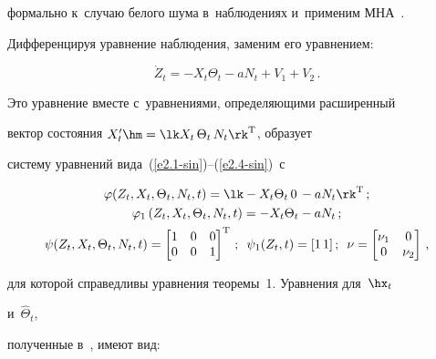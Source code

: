 формально к~случаю белого шума в~наблюдениях и~применим МНА~\cite{3-sin, 4-sin}. 


Дифференцируя уравнение наблюдения, заменим его уравнением:


\begin{equation*}


\dot Z_t= -X_t\Theta_t - aN_t +V_1+V_2\,.




\end{equation*}


Это уравнение вместе с~уравнениями, определяющими расширенный


вектор состояния $X_t' \hm=\lk X_t\,\Theta_t\,N_t\rk^{\mathrm{T}}$, образует


систему уравнений вида~(\ref{e2.1-sin})--(\ref{e2.4-sin})~с


\begin{gather*}


\varphi(Z_t,X_t,\Theta_t,


N_t,t) = \lk -X_t\Theta_t\,0\, -aN_t\rk^{\mathrm{T}}\,;\\


\varphi_1 \left(Z_t,X_t,\Theta_t,N_t,t\right)=-X_t\Theta_t -aN_t\,;\\


    \psi(Z_t,X_t,\Theta_t,N_t,t)=\begin{bmatrix}


     1&0&0\\


     0&0&1\end{bmatrix}^{\mathrm{T}}\,;\enskip 


     \psi_1(Z_t,t) =[1\,1]\,;


     \enskip \nu=


\begin{bmatrix}


    \nu_1&0\\


    0&\nu_2\end{bmatrix}\,,


    \end{gather*}


для которой справедливы урав\-не\-ния теоремы~1. Уравнения для~$\hx_t$


и~$\hat \Theta_t$, 


по\-лу\-чен\-ные в~\cite{3-sin, 4-sin}, имеют вид:





\vspace*{-5pt}





